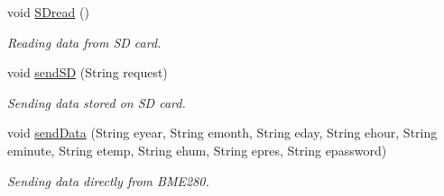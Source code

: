 \begin{DoxyCompactItemize}
void \hyperlink{_w_s_8ino_ae25c95c757003a1f2daacee7dae07105}{S\+Dread} ()
\begin{DoxyCompactList}\small\item\em Reading data from SD card. \end{DoxyCompactList}\item 
void \hyperlink{_w_s_8ino_acca4eb89d9cb2ffb1d5d9fa19d429f9c}{send\+SD} (String request)
\begin{DoxyCompactList}\small\item\em Sending data stored on SD card. \end{DoxyCompactList}\item 
void \hyperlink{_w_s_8ino_aa9f1e5f04588dc7c432816e2faac1c2a}{send\+Data} (String eyear, String emonth, String eday, String ehour, String eminute, String etemp, String ehum, String epres, String epassword)
\begin{DoxyCompactList}\small\item\em Sending data directly from B\+M\+E280. \end{DoxyCompactList}\end{DoxyCompactItemize}
